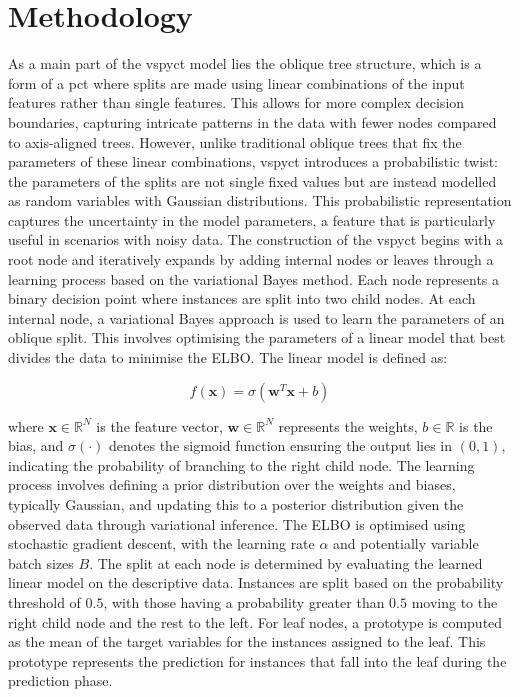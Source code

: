 \documentclass[3p,review,authoryear]{elsarticle}
\begin{document}
\section{Methodology}

As a main part of the \gls{vspyct} model lies the oblique tree structure, which is a form of a \gls{pct} where splits are made using linear combinations of the input features rather than single features.
This allows for more complex decision boundaries, capturing intricate patterns in the data with fewer nodes compared to axis-aligned trees.
However, unlike traditional oblique trees that fix the parameters of these linear combinations, \gls{vspyct} introduces a probabilistic twist: the parameters of the splits are not single fixed values but are instead modelled as random variables with Gaussian distributions.
This probabilistic representation captures the uncertainty in the model parameters, a feature that is particularly useful in scenarios with noisy data.
The construction of the \gls{vspyct} begins with a root node and iteratively expands by adding internal nodes or leaves through a learning process based on the variational Bayes method.
Each node represents a binary decision point where instances are split into two child nodes.
At each internal node, a variational Bayes approach is used to learn the parameters of an oblique split.
This involves optimising the parameters of a linear model that best divides the data to minimise the ELBO.
The linear model is defined as:

\begin{equation}
f(\mathbf{x})=\sigma \left(\mathbf{w}^T \mathbf{x} + b \right)
\label{eq:linear_model}
\end{equation}

where $\mathbf{x} \in \mathbb{R}^N$ is the feature vector, $\mathbf{w} \in \mathbb{R}^N$ represents the weights, $b \in \mathbb{R}$ is the bias, and $\sigma(\cdot)$ denotes the sigmoid function ensuring the output lies in $(0, 1)$, indicating the probability of branching to the right child node.
The learning process involves defining a prior distribution over the weights and biases, typically Gaussian, and updating this to a posterior distribution given the observed data through variational inference.
The ELBO is optimised using stochastic gradient descent, with the learning rate $\alpha$ and potentially variable batch sizes $B$.
The split at each node is determined by evaluating the learned linear model on the descriptive data.
Instances are split based on the probability threshold of $0.5$, with those having a probability greater than $0.5$ moving to the right child node and the rest to the left.
For leaf nodes, a prototype is computed as the mean of the target variables for the instances assigned to the leaf.
This prototype represents the prediction for instances that fall into the leaf during the prediction phase.
\end{document}
